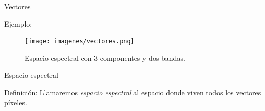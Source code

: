 \documentclass[]{beamer}
\begin{document}
\begin{frame}{Vectores}
  \begin{exampleblock}{Ejemplo:}
    \begin{figure}
      \texttt{[image: imagenes/vectores.png]}
      \caption{Espacio espectral con 3 componentes y dos bandas.}
    \end{figure}
  \end{exampleblock}
\end{frame}

\begin{frame}{Espacio espectral}
  \begin{block}{Definición:}
    Llamaremos \emph{espacio espectral} al espacio donde viven todos los vectores píxeles.
  \end{block}
\end{frame}
\end{document}
